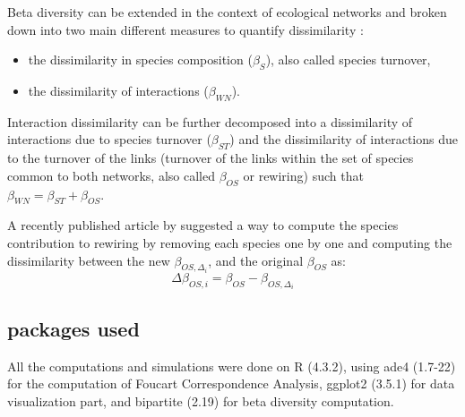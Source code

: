 Beta diversity can be extended in the context of ecological networks and broken down into two main different measures to quantify dissimilarity \citet{poisot_dissimilarity_2012}:
\begin{itemize}
    \item the dissimilarity in species composition ($\beta_S$), also called species turnover,
    \item the dissimilarity of interactions ($\beta_{WN}$).
\end{itemize}

 Interaction dissimilarity can be further decomposed into a dissimilarity of interactions due to species turnover ($\beta_{ST}$) and the dissimilarity of interactions due to the turnover of the links (turnover of the links within the set of species common to both networks, also called $\beta_{OS}$ or rewiring) such that $\beta_{WN} = \beta_{ST} + \beta_{OS}$. 

A recently published article by \citet{toju_interaction_2024} suggested a way to compute the species contribution to rewiring by removing each species one by one and computing the dissimilarity between the new $\beta_{OS,\Delta_i}$, and the original $\beta_{OS}$ as:
$$
    \Delta\beta_{OS,i} = \beta_{OS} - \beta_{OS,\Delta_i}
$$

\subsection{packages used}

All the computations and simulations were done on R (4.3.2), using ade4 (1.7-22) for the computation of Foucart Correspondence Analysis, ggplot2 (3.5.1) for data visualization part, and bipartite \citep{dormann_introducing_2008}(2.19) for beta diversity computation.
